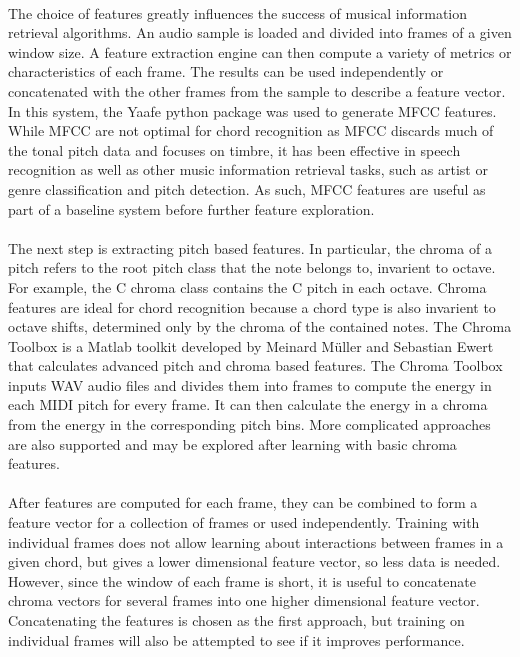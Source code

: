 \documentclass{article}
\begin{document}
\paragraph{}
The choice of features greatly influences the success of musical information retrieval algorithms. An audio sample is loaded and divided into
frames of a given window size. A feature extraction engine can then compute a variety of metrics or characteristics of each frame. The results
can be used independently or concatenated with the other frames from the sample to describe a feature vector. In this system, the Yaafe python
package was used to generate MFCC features. While MFCC are not optimal for chord recognition as MFCC discards much of the tonal pitch data and
focuses on timbre, it has been effective in speech recognition as well as other music information retrieval tasks, such as artist or genre classification and pitch detection.
As such, MFCC features are useful as part of a baseline system before further feature exploration.

\paragraph{}
The next step is extracting pitch based features. In particular, the chroma of a pitch refers to the root pitch class that the note belongs to, invarient to octave.
For example, the C chroma class contains the C pitch in each octave. Chroma features are ideal for chord recognition because a chord type is also invarient to octave shifts, determined
only by the chroma of the contained notes.  The Chroma Toolbox is a Matlab toolkit developed by Meinard M\"uller and Sebastian Ewert that calculates advanced pitch and chroma based features.
The Chroma Toolbox inputs WAV audio files and divides them into frames to compute the energy in each MIDI pitch for every frame. It can then calculate the energy in a chroma from the energy in the corresponding
pitch bins. More complicated approaches are also supported and may be explored after learning with basic chroma features.

\paragraph{}
After features are computed for each frame, they can be combined to form a feature vector for a collection of frames or used independently. Training with individual frames does not allow learning about interactions between
frames in a given chord, but gives a lower dimensional feature vector, so less data is needed. However, since the window of each frame is short, it is useful to concatenate chroma vectors for several frames into one higher
dimensional feature vector. Concatenating the features is chosen as the first approach, but training on individual frames will also be attempted to see if it improves performance. 
\end{document}
